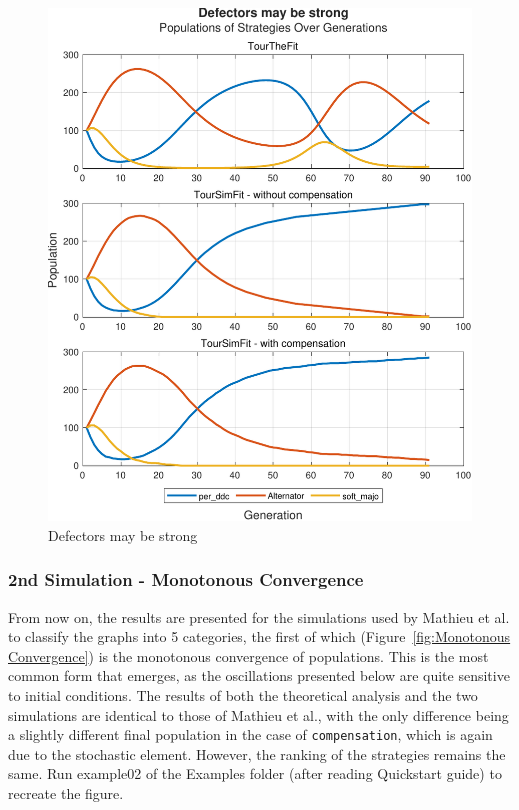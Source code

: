 \documentclass[12pt]{article}
\begin{document}
	\begin{figure}[h]
	      \centering
	      \includegraphics[scale=0.8]{Defectors may be strong.pdf}
	      \caption{Defectors may be strong}
	      \label{fig:Defectors may be strong}
	\end{figure}
\subsubsection{2nd Simulation - Monotonous Convergence}
From now on, the results are presented for the simulations used by Mathieu et al. to classify the graphs into 5 categories, the first of which (Figure~\ref{fig:Monotonous Convergence}) is the monotonous convergence of populations. This is the most common form that emerges, as the oscillations presented below are quite sensitive to initial conditions. The results of both the theoretical analysis and the two simulations are identical to those of Mathieu et al., with the only difference being a slightly different final population in the case of \texttt{compensation}, which is again due to the stochastic element. However, the ranking of the strategies remains the same. Run example02 of the Examples folder (after reading Quickstart guide) to recreate the figure.
\end{document}
